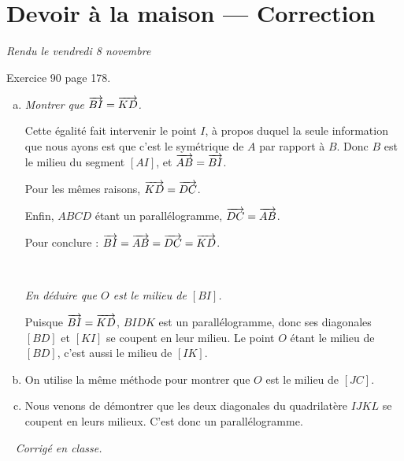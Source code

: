 \documentclass[11pt]{article}
\begin{document}
  \section*{Devoir à la maison --- Correction}
  \emph{Rendu le vendredi 8 novembre}
  \setcounter{exercice}{0}

  \begin{exercice}[Vecteurs] Exercice 90 page 178.


    \begin{enumerate}[a.]
      \item \emph{Montrer que $\overrightarrow{BI}=\overrightarrow{KD}$.}

        Cette égalité fait intervenir le point $I$, à propos duquel la seule
        information que nous ayons est que c'est le symétrique de $A$ par
        rapport à $B$.  Donc $B$ est le milieu du segment $[AI]$, et
        $\overrightarrow{AB}=\overrightarrow{BI}$.

        Pour les mêmes raisons, $\overrightarrow{KD}=\overrightarrow{DC}$.

        Enfin, $ABCD$ étant un parallélogramme, $\overrightarrow{DC}=\overrightarrow{AB}$.

        Pour conclure : $\overrightarrow{BI}=\overrightarrow{AB}=\overrightarrow{DC}=\overrightarrow{KD}$.

        ~

        \emph{En déduire que $O$ est le milieu de $[BI]$.}

        Puisque $\overrightarrow{BI}=\overrightarrow{KD}$, $BIDK$ est un parallélogramme,
        donc ses diagonales $[BD]$ et $[KI]$ se coupent en leur milieu. Le
        point $O$ étant le milieu de $[BD]$, c'est aussi le milieu de $[IK]$.

      \item On utilise la même méthode pour montrer que $O$ est le milieu de $[JC]$.

      \item Nous venons de démontrer que les deux diagonales du quadrilatère $IJKL$ se coupent en leurs milieux. C'est donc un parallélogramme.
  \end{enumerate}
  \end{exercice}

  \begin{exercice}[Algorithmique]~
    \emph{Corrigé en classe.}
  \end{exercice}
\end{document}
